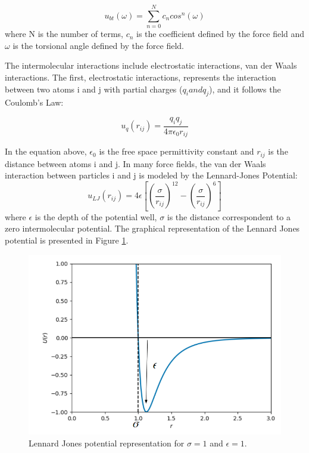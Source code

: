 \begin{equation}
u_{bt}(\omega) = \sum_{n=0}^{N}  c_{n} cos^{n} (\omega) 
\end{equation}
where N is the number of terms, $c_{n}$ is the coefficient defined by the force field and $\omega$ is the torsional angle defined by the force field. 

The intermolecular interactions include electrostatic interactions, van der Waals interactions. The first, electrostatic interactions, represents the interaction between two atoms i and j with partial charges ($q_{i} and q_{j}$), and it follows the Coulomb's Law:

\begin{equation}
u_{q}(r_{ij}) = \frac{q_{i}q_{j}}{4 \pi \epsilon _{0} r_{ij}}
\end{equation} 

In the equation above, $\epsilon _{0}$ is the free space permittivity constant and $r_{ij}$ is the distance between atoms i and j. In many force fields, the van der Waals interaction between particles i and j is modeled by the Lennard-Jones Potential:
\begin{equation}
u_{LJ}(r_{ij}) = 4 \epsilon
\left[ \left(\frac{\sigma}{r_{ij}} \right)^{12} - \left(\frac{\sigma}{r_{ij}} \right)^{6} \right]
\end{equation}
where  $\epsilon$ is the depth of the potential well, $\sigma$ is the distance correspondent to a zero intermolecular potential. The graphical representation of the Lennard Jones potential is presented in Figure \ref{fig:lj}.
\begin{figure}[H]
	\centering
	\includegraphics[width=0.9\linewidth]{Figures/lj2}
	\caption{Lennard Jones potential representation for $\sigma = 1$ and $\epsilon = 1$. }
	\label{fig:lj}
\end{figure}

